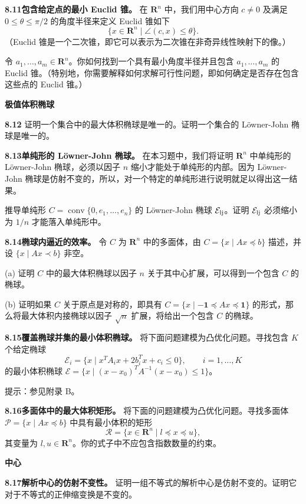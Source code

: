 \documentclass[UTF8, 12pt, fontset=fandol, oneside]{ctexart}
\begin{document}
\noindent\textbf{8.11\quad 包含给定点的最小 Euclid 锥。}
在 $\mathbf{R}^n$ 中，我们用中心方向 $c\neq 0$ 及满足 $0\leq\theta\leq\pi/2$ 的角度半径来定义 Euclid 锥如下
\[
\{x\in\mathbf{R}^n\mid \angle(c,x)\leq\theta\}.
\]
（Euclid 锥是一个二次锥，即它可以表示为二次锥在非奇异线性映射下的像。）

令 $a_1,\ldots,a_m\in\mathbf{R}^n$。你如何找到一个具有最小角度半径并且包含 $a_1,\ldots,a_m$ 的 Euclid 锥。（特别地，你需要解释如何求解可行性问题，即如何确定是否存在包含这些点的 Euclid 锥。）

\noindent\textbf{极值体积椭球}

\noindent\textbf{8.12}
证明一个集合中的最大体积椭球是唯一的。证明一个集合的 Löwner-John 椭球是唯一的。

\noindent\textbf{8.13\quad 单纯形的 Löwner-John 椭球。}
在本习题中，我们将证明 $\mathbf{R}^n$ 中单纯形的 Löwner-John 椭球，必须以因子 $n$ 缩小才能处于单纯形的内部。因为 Löwner-John 椭球是仿射不变的，所以，对一个特定的单纯形进行说明就足以得出这一结果。

推导单纯形 $C=\operatorname{conv}\{0,e_1,\ldots,e_n\}$ 的 Löwner-John 椭球 $\mathcal E_{\rm lj}$。证明 $\mathcal E_{\rm lj}$ 必须缩小为 $1/n$ 才能落入单纯形中。

\noindent\textbf{8.14\quad 椭球内逼近的效率。}
令 $C$ 为 $\mathbf{R}^n$ 中的多面体，由 $C=\{x\mid Ax\preceq b\}$ 描述，并设 $\{x\mid Ax\prec b\}$ 非空。

(a) 证明 $C$ 中的最大体积椭球以因子 $n$ 关于其中心扩展，可以得到一个包含 $C$ 的椭球。

(b) 证明如果 $C$ 关于原点是对称的，即具有 $C=\{x\mid -\mathbf{1}\preceq Ax\preceq \mathbf{1}\}$ 的形式，那么将最大体积内接椭球以因子 $\sqrt n$ 扩展，将给出一个包含 $C$ 的椭球。

\noindent\textbf{8.15\quad 覆盖椭球并集的最小体积椭球。}
将下面问题建模为凸优化问题。寻找包含 $K$ 个给定椭球
\[
\mathcal E_i=\{x\mid x^TA_ix+2b_i^Tx+c_i\leq 0\},\qquad i=1,\ldots,K
\]
的最小体积椭球 $\mathcal E=\{x\mid (x-x_0)^TA^{-1}(x-x_0)\leq 1\}$。

提示：参见附录 B。

\noindent\textbf{8.16\quad 多面体中的最大体积矩形。}
将下面的问题建模为凸优化问题。寻找多面体 $\mathcal P=\{x\mid Ax\preceq b\}$ 中具有最小体积的矩形
\[
\mathcal R=\{x\in\mathbf{R}^n\mid l\preceq x\preceq u\},
\]
其变量为 $l,u\in\mathbf{R}^n$。你的式子中不应包含指数数量的约束。

\noindent\textbf{中心}

\noindent\textbf{8.17\quad 解析中心的仿射不变性。}
证明一组不等式的解析中心是仿射不变的。证明它对于不等式的正伸缩变换是不变的。
\end{document}
